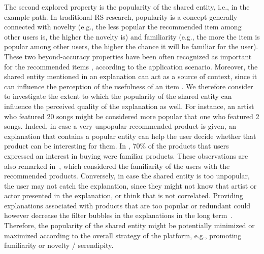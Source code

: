 \documentclass[sigconf]{acmart}
\begin{document}
\vspace{1mm}  
The second explored property is the popularity of the shared entity, i.e.,  in the example path. In traditional RS research, popularity is a concept generally connected with novelty (e.g., the less popular the recommended item among other users is, the higher the novelty is) and familiarity (e.g., the more the item is popular among other users, the higher the chance it will be familiar for the user). These two beyond-accuracy properties have been often recognized as important for the recommended items \cite{DBLP:journals/tiis/KaminskasB17}, according to the application scenario. {\color{black} Moreover, the shared entity mentioned in an explanation can act as a source of context, since it can influence the perception of the usefulness of an item \cite{10.1145/2533670.2533675}}. We therefore consider to investigate the extent to which the popularity of the shared entity can influence the perceived quality of the explanation as well. 
For instance, an artist who featured 20 songs might be considered more popular that one who featured 2 songs. 
Indeed, in case a very unpopular recommended product is given, an explanation that contains a popular entity can help the user decide whether that product can be interesting for them. 
In \cite{SwearingenS02}, 70\% of the products that users expressed an interest in buying were familiar products.
These observations are also remarked in~\cite{PuCH12}, which considered the familiarity of the users with the recommended products. 
Conversely, in case the shared entity is too unpopular, the user may not catch the explanation, since they might not know that artist or actor presented in the explanation, or think that is not correlated. 
Providing explanations associated with products that are too popular or redundant could however decrease the filter bubbles in the explanations in the long term~\cite{GedikliJG14}.
Therefore, the popularity of the shared entity might be potentially minimized or maximized according to the overall strategy of the platform, e.g., promoting familiarity or novelty / serendipity. 
\end{document}
